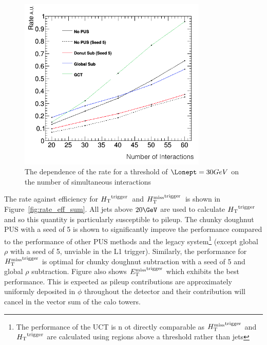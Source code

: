 \begin{figure}
\centering
    \includegraphics[width=0.8\textwidth]{./Figures/triggerUpgrade/neutrinonvtx_jet1}
  \caption{The dependence of the rate for a threshold of $\Lonept=30GeV$ on the number of simultaneous interactions}
  \label{fig:rate_nvtx}
\end{figure}

The rate against efficiency for $\mbox{$H_\text{T}$}^{\text{trigger}}$~and $\mbox{$H_{\rm T}^{\rm miss}$}^{\text{trigger}}$~is shown in Figure~\ref{fig:rate_eff_sum}. All jets above $20\GeV$ are
used to calculate $\mbox{$H_\text{T}$}^{\text{trigger}}$ and so this quantity is particularly susceptible to pileup. The chunky doughnut 
PUS with a seed of 5 is shown to significantly improve the performance compared to the performance of other PUS
methods and the legacy system\footnote{The performance of the UCT is n
ot directly comparable as $\mbox{$H_{\rm T}^{\rm miss}$}^{\text{trigger}}$ and  $\mbox{$H_\text{T}$}^{\text{trigger}}$ are calculated using regions above a threshold
rather than jets} (except global $\rho$ with a seed of 5, unviable in the L1 trigger). Similarly, the performance for 
$\mbox{$H_{\rm T}^{\rm miss}$}^{\text{trigger}}$ is optimal for chunky doughnut subtraction with a seed of 5 and global $\rho$ subtraction. 
Figure  also shows  $\mbox{$E_\text{T}^{\rm miss}$}^{\text{trigger}}$ which exhibits the best performance. This is expected as 
pileup contributions are approximately uniformly deposited in $\phi$ throughout the detector and their contribution will
cancel in the vector sum of the calo towers.


